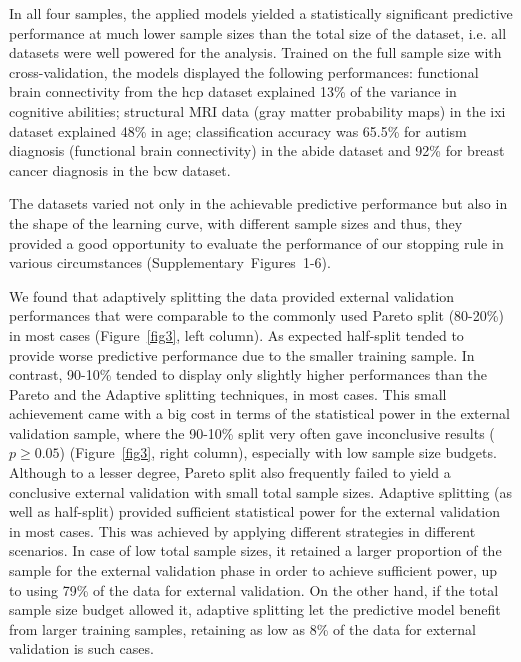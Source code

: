 \documentclass{article}
\begin{document}
In all four samples, the applied models yielded a statistically significant predictive performance at much lower sample sizes than the total size of the dataset, i.e. all datasets were well powered for the analysis. Trained on the full sample size with cross-validation, the models displayed the following performances: functional brain connectivity from the \acrshort{hcp} dataset explained 13\% of the variance in cognitive abilities; structural MRI data (gray matter probability maps) in the \acrshort{ixi} dataset explained 48\% in age; classification accuracy was 65.5\% for autism diagnosis (functional brain connectivity) in the \acrshort{abide} dataset and 92\% for breast cancer diagnosis in the \acrshort{bcw} dataset.

The datasets varied not only in the achievable predictive performance but also in the shape of the learning curve, with different sample sizes and thus, they provided a good opportunity to evaluate the performance of our stopping rule in various circumstances (Supplementary~Figures~1-6).

We found that adaptively splitting the data provided external validation performances that were comparable to the commonly used Pareto split (80-20\%) in most cases (Figure~\ref{fig3}, left column). As expected half-split tended to provide worse predictive performance due to the smaller training sample. In contrast, 90-10\% tended to display only slightly higher performances than the Pareto and the Adaptive splitting techniques, in most cases.
This small achievement came with a big cost in terms of the statistical power in the external validation sample, where the 90-10\% split very often gave inconclusive results ($p\geq0.05$)
(Figure~\ref{fig3}, right column), especially with low sample size budgets.
Although to a lesser degree, Pareto split also frequently failed to yield a conclusive external validation with small total sample sizes. Adaptive splitting (as well as half-split) provided sufficient statistical power for the external validation in most cases. This was achieved by applying different strategies in different scenarios. In case of low total sample sizes, it retained a larger proportion of the sample for the external validation phase in order to achieve sufficient power, up to using 79\% of the data for external validation. On the other hand, if the total sample size budget allowed it, adaptive splitting let the predictive model benefit from larger training samples, retaining as low as 8\% of the data for external validation is such cases.
\end{document}
